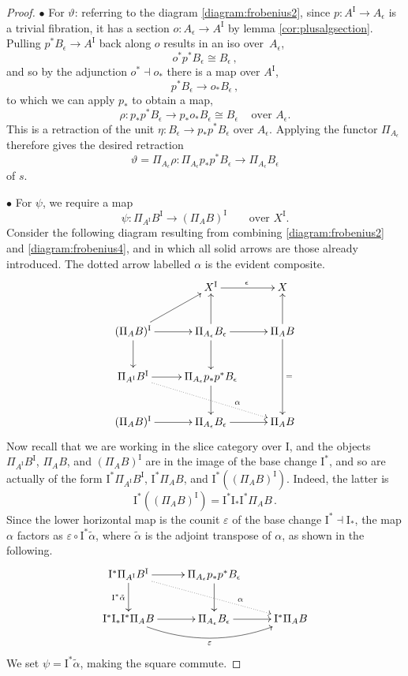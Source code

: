 \documentclass[12pt]{article}
\newcommand{\ra}{\ensuremath{\rightarrow}}
\newcommand{\I}{\ensuremath{\mathrm{I}}}
\theoremstyle{remark}
\theoremstyle{definition}
\begin{document}
\begin{proof}
\noindent $\bullet$ For $\vartheta$: referring to the diagram \eqref{diagram:frobenius2}, since $p : A^\I \ra A_\epsilon$ is a trivial fibration, it has a section $o :  A_\epsilon \ra A^\I$ by lemma \ref{cor:plusalgsection}.  Pulling  $p^*B_\epsilon \ra A^\I$ back along $o$ results in an iso over~$A_\epsilon$,
\[
o^*p^* B_\epsilon \cong B_\epsilon \,,
\]
and so by the adjunction $o^*\!\dashv o_*$ there is a map over $A^\I$,
\[
p^* B_\epsilon \ra o_* B_\epsilon \,,
\]
to which we can apply $p_*$ to obtain a map,
\[
\rho : p_*p^* B_\epsilon \ra p_*o_*B_\epsilon \cong B_\epsilon\,\quad \text{over $A_\epsilon$.}
\]
This is a retraction of the unit $\eta : B_\epsilon \ra p_*p^* B_\epsilon$ over $A_\epsilon$.  Applying the functor $ \Pi_{A_\epsilon}$ therefore gives the desired retraction $$\vartheta = \Pi_{A_\epsilon}\rho :  \Pi_{A_\epsilon}p_*p^* B_\epsilon \ra \Pi_{A_\epsilon}B_\epsilon$$ of $s$.

\medskip
\noindent $\bullet$ For $\psi$, we require a map 
\[
\psi:\Pi_{A^\I}B^\I \ra (\Pi_AB)^\I \qquad \text{over $X^\I$.}
\]
Consider the following diagram resulting from combining \eqref{diagram:frobenius2} and \eqref{diagram:frobenius4}, and in which all solid arrows are those already introduced. The dotted arrow labelled $\alpha$ is the evident composite.
\begin{equation}\label{diagram:frobenius8}
\xymatrix{
& X^\I \ar[r]^\epsilon & X \\
 (\Pi_AB)^\I  \ar[r]  \ar[ru] \ar[d] & \Pi_{A_\epsilon}B_\epsilon  \ar[u] \ar[d] \ar[r] & \Pi_{A}B \ar[u]\ar[dd]^= \\
 \Pi_{A^\I}B^\I \ar[r] \ar@{..>}[rrd]^>>>>>>>>>>>\alpha & \Pi_{A_\epsilon} p_*p^* B_\epsilon \ar[d] & \\
  (\Pi_AB)^\I  \ar[r]  & \Pi_{A_\epsilon}B_\epsilon \ar[r] & \Pi_{A}B 
}
\end{equation}
Now recall that we are working in the slice category over $\I$, and the objects  $\Pi_{A^\I}B^\I $, $\Pi_{A}B$, and $(\Pi_AB)^\I $ are in the image of the base change $\I^*$, and so are actually  of the form $\I^*\Pi_{A^\I}B^\I $, $\I^*\Pi_{A}B$, and $\I^*((\Pi_AB)^\I) $.  Indeed, the latter is 
\[
\I^*((\Pi_AB)^\I) = \I^*\I_*\I^*\Pi_AB\,.
\]
Since the lower horizontal map is the counit $\varepsilon$ of the base change $\I^* \dashv \I_*$, the map $\alpha$ factors as $\varepsilon\circ\I^*\tilde{\alpha}$, where $\tilde{\alpha}$ is the adjoint transpose of $\alpha$, as shown in the following.
\begin{equation}\label{diagram:frobenius9}
\xymatrix{
\I^*\Pi_{A^\I}B^\I \ar[d]_{\I^*\tilde{\alpha}} \ar[r] \ar@{..>}[rrd]^>>>>>>>>>>>\alpha & \Pi_{A_\epsilon} p_*p^* B_\epsilon \ar[d] & \\
  \I^*\I_*\I^*\Pi_AB  \ar[r] \ar@/_4ex/ [rr]_\varepsilon & \Pi_{A_\epsilon}B_\epsilon \ar[r] & \I^*\Pi_{A}B 
}
\end{equation}
We set $\psi = \I^*\tilde{\alpha}$, making the square commute.  


\end{proof}
\end{document}
